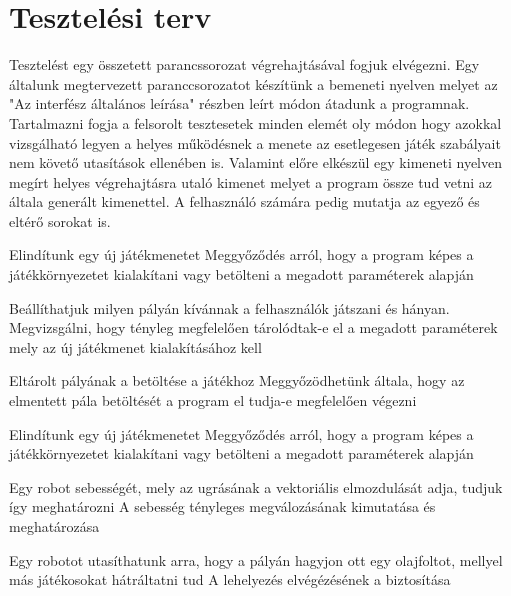 \section{Tesztelési terv}

Tesztelést egy összetett parancssorozat végrehajtásával fogjuk elvégezni. Egy általunk megtervezett paranccsorozatot készítünk a bemeneti nyelven melyet az "Az interfész általános leírása" részben leírt módon átadunk a programnak. Tartalmazni fogja a felsorolt tesztesetek minden elemét oly módon hogy azokkal vizsgálható legyen a helyes működésnek a menete az esetlegesen játék szabályait nem követő utasítások ellenében is. Valamint előre elkészül egy kimeneti nyelven megírt helyes végrehajtásra utaló kimenet melyet a program össze tud vetni az általa generált kimenettel. A felhasználó számára pedig mutatja az egyező és eltérő sorokat is. 

%
{Elindítunk egy új játékmenetet}%
{Meggyőződés arról, hogy a program képes a játékkörnyezetet kialakítani vagy betölteni a megadott paraméterek alapján}

%
{Beállíthatjuk milyen pályán kívánnak a felhasználók játszani és hányan.}%
{Megvizsgálni, hogy tényleg megfelelően tárolódtak-e el a megadott paraméterek mely az új játékmenet kialakításához kell}

%
{Eltárolt pályának a betöltése a játékhoz}%
{Meggyőzödhetünk általa, hogy az elmentett pála betöltését a program el tudja-e megfelelően végezni}

%
{Elindítunk egy új játékmenetet}%
{Meggyőződés arról, hogy a program képes a játékkörnyezetet kialakítani vagy betölteni a megadott paraméterek alapján}

%
{Egy robot sebességét, mely az ugrásának a vektoriális elmozdulását adja, tudjuk így meghatározni}%
{A sebesség tényleges megválozásának kimutatása és meghatározása}

%
{Egy robotot utasíthatunk arra, hogy a pályán hagyjon ott egy olajfoltot, mellyel más játékosokat hátráltatni tud}%
{A lehelyezés elvégézésének a biztosítása}

